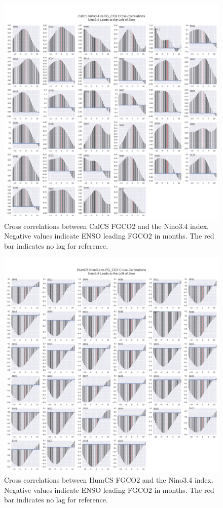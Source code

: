 \documentclass[12pt]{article}
\begin{document}
\newpage
\begin{figure}[!h]
	\centering
	\includegraphics[width=\linewidth]{../../figs/calcs/cross-correlation/Nino34_FGCO2_cross-correlation_CalCS.png}
	\caption{Cross correlations between CalCS FGCO2 and the Nino3.4 index. Negative values indicate ENSO leading FGCO2 in months. The red bar indicates no lag for reference.}
	\label{fig:CalCS-ENSO-Cross}
\end{figure}
\newpage
\begin{figure}[!h]
	\centering
	\includegraphics[width=\linewidth]{../../figs/humcs/cross-correlation/Nino34_FGCO2_cross-correlation_HumCS.png}
	\caption{Cross correlations between HumCS FGCO2 and the Nino3.4 index. Negative values indicate ENSO leading FGCO2 in months. The red bar indicates no lag for reference.}
	\label{fig:HumCS-ENSO-Cross}
\end{figure}
\end{document}
